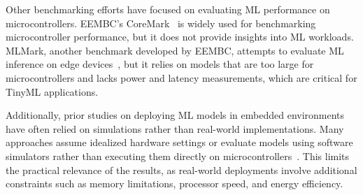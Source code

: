 \documentclass[conference]{IEEEtran}
\begin{document}
Other benchmarking efforts have focused on evaluating ML performance on microcontrollers. {EEMBC's CoreMark}~\cite{coremark2009} is widely used for benchmarking microcontroller performance, but it does not provide insights into ML workloads. {MLMark}, another benchmark developed by EEMBC, attempts to evaluate ML inference on edge devices~\cite{mlmark2020}, but it relies on models that are too large for microcontrollers and lacks power and latency measurements, which are critical for TinyML applications.

Additionally, prior studies on deploying ML models in embedded environments have often relied on {simulations} rather than real-world implementations. Many approaches assume idealized hardware settings or evaluate models using software simulators rather than executing them directly on microcontrollers~\cite{fedorov2019sparse}. This limits the practical relevance of the results, as real-world deployments involve additional constraints such as memory limitations, processor speed, and energy efficiency.


\begin{table}[!htbp]
    \centering
    \vspace{0.6em}
    \caption{Overall results for each scenario.}
    \label{tab:img}
\end{table}
\end{document}
